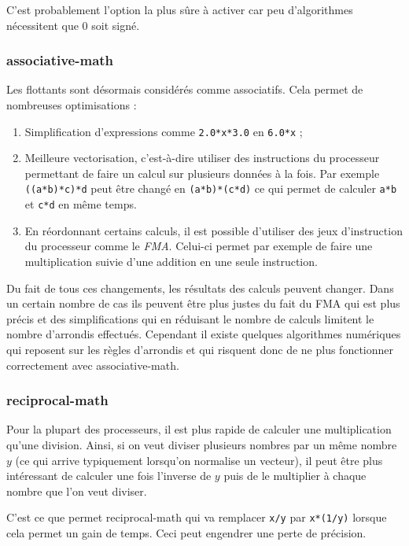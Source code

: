 \documentclass[a4paper]{report}
\begin{document}
C'est probablement l'option la plus sûre à activer car peu d'algorithmes nécessitent que $0$ soit signé.

\subsubsection{associative-math}
Les flottants sont désormais considérés comme associatifs.
Cela permet de nombreuses optimisations :
\begin{enumerate}
    \item Simplification d'expressions comme \verb'2.0*x*3.0' en \verb'6.0*x' ;
    \item Meilleure vectorisation, c'est-à-dire utiliser des instructions du processeur permettant de faire un calcul sur plusieurs données à la fois.
          Par exemple \verb'((a*b)*c)*d' peut être changé en \verb'(a*b)*(c*d)' ce qui permet de calculer \verb'a*b' et \verb'c*d' en même temps.
    \item En réordonnant certains calculs, il est possible d'utiliser des jeux d'instruction du processeur comme le \emph{FMA}.
          Celui-ci permet par exemple de faire une multiplication suivie d'une addition en une seule instruction.
\end{enumerate}

Du fait de tous ces changements, les résultats des calculs peuvent changer.
Dans un certain nombre de cas ils peuvent être plus justes du fait du FMA qui est plus précis et des simplifications qui en réduisant le nombre de calculs limitent le nombre d'arrondis effectués.
Cependant il existe quelques algorithmes numériques qui reposent sur les règles d'arrondis et qui risquent donc de ne plus fonctionner correctement avec associative-math.

\subsubsection{reciprocal-math}
Pour la plupart des processeurs, il est plus rapide de calculer une multiplication qu'une division.
Ainsi, si on veut diviser plusieurs nombres par un même nombre $y$ (ce qui arrive typiquement lorsqu'on normalise un vecteur), il peut être plus intéressant de calculer une fois l'inverse de $y$ puis de le multiplier à chaque nombre que l'on veut diviser.

C'est ce que permet reciprocal-math qui va remplacer \verb'x/y' par \verb'x*(1/y)' lorsque cela permet un gain de temps.
Ceci peut engendrer une perte de précision.
\end{document}
